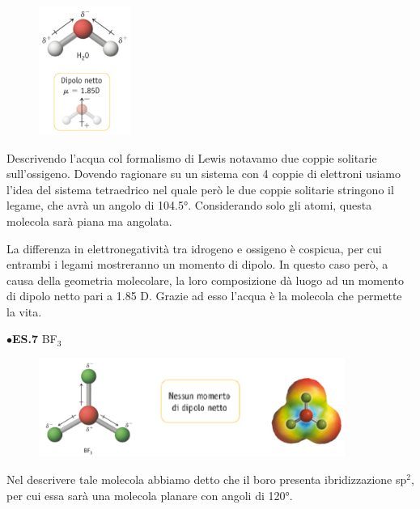 \hspace{0.5cm}\begin{minipage}{0.2\textwidth}
    \begin{figure}[H]
    \includegraphics[width=3cm]{immagini/H_2O.png}
    \end{figure}
    \end{minipage} \hfill
    \begin{minipage}{0.65\textwidth}
    \vspace{0.6cm}Descrivendo l'acqua col formalismo di Lewis notavamo due coppie solitarie sull'ossigeno. Dovendo ragionare su un sistema con 4 coppie di elettroni usiamo l'idea del sistema tetraedrico nel quale però le due coppie solitarie stringono il legame, che avrà un angolo di 104.5°. Considerando solo gli atomi, questa molecola sarà piana ma angolata.

    La differenza in elettronegatività tra idrogeno e ossigeno è cospicua, per cui entrambi i legami mostreranno un momento di dipolo. In questo caso però, a causa della geometria molecolare, la loro composizione dà luogo ad un momento di dipolo netto pari a 1.85 D. Grazie ad esso l'acqua è la molecola che permette la vita.    
    \end{minipage}

\vspace{0.2cm}$\bullet$\textbf{ES.7} BF$_3$

\begin{figure}[htp]
    \centering
    \includegraphics[width=10cm]{immagini/BF_3-dipolo.png}
\end{figure}

Nel descrivere tale molecola abbiamo detto che il boro presenta ibridizzazione sp$^2$, per cui essa sarà una molecola planare con angoli di 120°.

